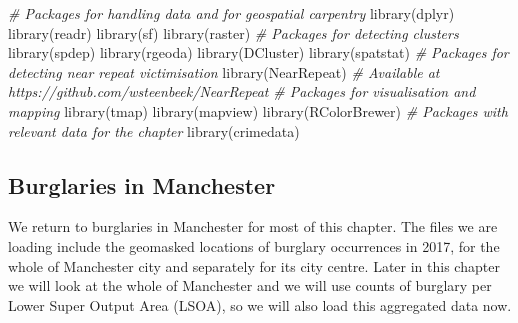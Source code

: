 \documentclass[
  krantz2]{krantz}
\makeatletter
\newenvironment{Shaded}{\begin{snugshade}}{\end{snugshade}}
\newcommand{\CommentTok}[1]{\textcolor[rgb]{0.37,0.37,0.37}{\textit{#1}}}
\newcommand{\FunctionTok}[1]{\textcolor[rgb]{0,0,0}{#1}}
\newcommand{\NormalTok}[1]{#1}
\newenvironment{kframe}{%
\medskip{}
\setlength{\fboxsep}{.8em}
 \def\at@end@of@kframe{}%
 \ifinner\ifhmode%
  \def\at@end@of@kframe{\end{minipage}}%
  \begin{minipage}{\columnwidth}%
 \fi\fi%
 \def\FrameCommand##1{\hskip\@totalleftmargin \hskip-\fboxsep
 \colorbox{shadecolor}{##1}\hskip-\fboxsep
     \hskip-\linewidth \hskip-\@totalleftmargin \hskip\columnwidth}%
 \MakeFramed {\advance\hsize-\width
   \@totalleftmargin\z@ \linewidth\hsize
   \@setminipage}}%
 {\par\unskip\endMakeFramed%
 \at@end@of@kframe}
\renewenvironment{Shaded}{\begin{kframe}}{\end{kframe}}
\makeatother
\begin{document}
\begin{Shaded}
\begin{Highlighting}[]
\CommentTok{\# Packages for handling data and for geospatial carpentry}
\FunctionTok{library}\NormalTok{(dplyr)}
\FunctionTok{library}\NormalTok{(readr)}
\FunctionTok{library}\NormalTok{(sf)}
\FunctionTok{library}\NormalTok{(raster)}
\CommentTok{\# Packages for detecting clusters}
\FunctionTok{library}\NormalTok{(spdep)}
\FunctionTok{library}\NormalTok{(rgeoda)}
\FunctionTok{library}\NormalTok{(DCluster)}
\FunctionTok{library}\NormalTok{(spatstat)}
\CommentTok{\# Packages for detecting near repeat victimisation}
\FunctionTok{library}\NormalTok{(NearRepeat) }\CommentTok{\# Available at https://github.com/wsteenbeek/NearRepeat}
\CommentTok{\# Packages for visualisation and mapping}
\FunctionTok{library}\NormalTok{(tmap)}
\FunctionTok{library}\NormalTok{(mapview)}
\FunctionTok{library}\NormalTok{(RColorBrewer)}
\CommentTok{\# Packages with relevant data for the chapter}
\FunctionTok{library}\NormalTok{(crimedata)}
\end{Highlighting}
\end{Shaded}

\hypertarget{burglaries-in-manchester}{%
\subsection{Burglaries in Manchester}\label{burglaries-in-manchester}}

We return to burglaries in Manchester for most of this chapter. The files we are loading include the geomasked locations of burglary occurrences in 2017, for the whole of Manchester city and separately for its city centre. Later in this chapter we will look at the whole of Manchester and we will use counts of burglary per Lower Super Output Area (LSOA), so we will also load this aggregated data now.
\end{document}
